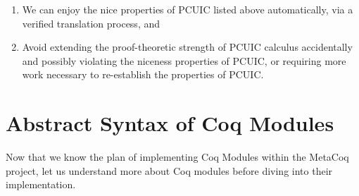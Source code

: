 \begin{enumerate}
    \item We can enjoy the nice properties of PCUIC listed above automatically,
    via a verified translation process, and
    \item Avoid extending the proof-theoretic strength of PCUIC calculus
    accidentally and possibly violating the niceness properties of PCUIC, or
    requiring more work necessary to re-establish the properties of PCUIC.
\end{enumerate}


\section{Abstract Syntax of Coq Modules}
\label{sec:abstract-syntax}

Now that we know the plan of implementing Coq Modules within the MetaCoq
project, let us understand more about Coq modules before diving into their
implementation.

